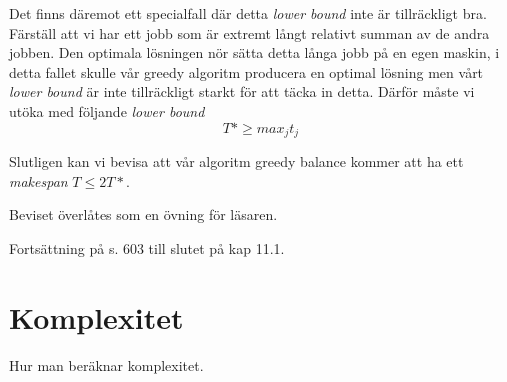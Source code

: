 \documentclass[a4paper]{report}
\begin{document}
Det finns däremot ett specialfall där detta \emph{lower bound} inte är
tillräckligt bra. Färställ att vi har ett jobb som är extremt långt relativt
summan av de andra jobben. Den optimala lösningen nör sätta detta långa jobb på
en egen maskin, i detta fallet skulle vår greedy algoritm producera en optimal
lösning men vårt \emph{lower bound} är inte tillräckligt starkt för att täcka
in detta. Därför måste vi utöka med följande \emph{lower bound}
\begin{equation}
	T* \geq max_j t_j
\end{equation}

Slutligen kan vi bevisa att vår algoritm greedy balance kommer att ha ett
\emph{makespan} $T \leq 2T*$.

Beviset överlåtes som en övning för läsaren.

Fortsättning på s. 603 till slutet på kap 11.1.


\section{Komplexitet}
Hur man beräknar komplexitet.
\end{document}
